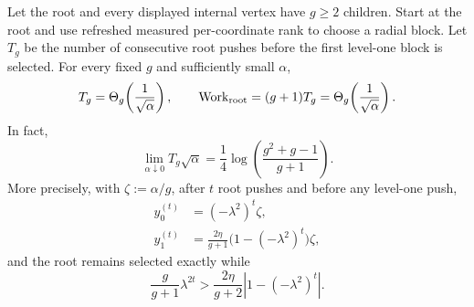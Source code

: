 \begin{proposition}
\label{prop:direct-homogeneous-root-echo}
Let the root and every displayed internal vertex have $g\geq2$ children.
Start at the root and use refreshed measured per-coordinate rank to choose a
radial block.  Let $T_g$ be the number of consecutive root pushes before the
first level-one block is selected.  For every fixed $g$ and sufficiently
small $\alpha$,
\begin{equation}
 T_g=\Theta_g\!\left(\frac1{\sqrt\alpha}\right),
 \qquad
 \operatorname{Work}_{\rm root}=(g+1)T_g
 =\Theta_g\!\left(\frac1{\sqrt\alpha}\right).
 \label{eq:direct-homogeneous-root-echo}
\end{equation}
In fact,
\begin{equation}
 \lim_{\alpha\downarrow0}T_g\sqrt\alpha
 =\frac14\log\!\left(\frac{g^2+g-1}{g+1}\right).
 \label{eq:direct-homogeneous-root-limit}
\end{equation}
More precisely, with $\zeta:=\alpha/g$, after $t$ root pushes and before any
level-one push,
\begin{align}
 y_0^{(t)}&=(-\lambda^2)^t\zeta,
 \label{eq:direct-homogeneous-root-residual}\\
 y_1^{(t)}&=\frac{2\eta}{g+1}
 \bigl(1-(-\lambda^2)^t\bigr)\zeta,
 \label{eq:direct-homogeneous-child-residual}
\end{align}
and the root remains selected exactly while
\begin{equation}
 \frac{g}{g+1}\lambda^{2t}
 >\frac{2\eta}{g+2}
 \left|1-(-\lambda^2)^t\right|.
 \label{eq:direct-homogeneous-root-rank}
\end{equation}
\end{proposition}

